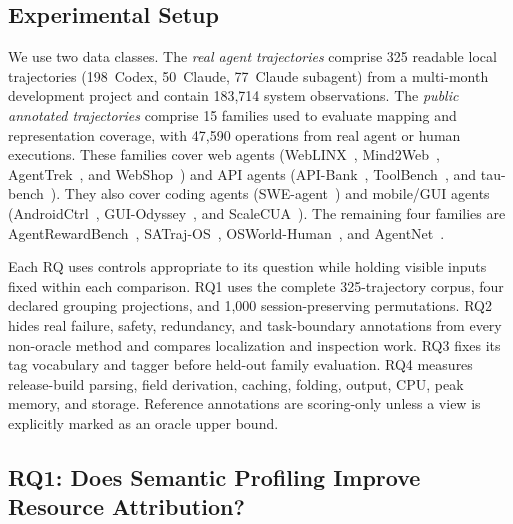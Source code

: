 \documentclass[letterpaper]{article}
\begin{document}
\subsection{Experimental Setup}

We use two data classes.
The \emph{real agent trajectories} comprise 325 readable local
trajectories (198~Codex, 50~Claude, 77~Claude subagent) from a
multi-month development project and contain 183{,}714 system
observations.
The \emph{public annotated trajectories} comprise 15 families used to
evaluate mapping and representation coverage, with 47{,}590 operations
from real agent or human executions.
These families cover web agents (WebLINX~\cite{weblinx},
Mind2Web~\cite{mind2web}, AgentTrek~\cite{agenttrek}, and
WebShop~\cite{webshop}) and API agents (API-Bank~\cite{apibank},
ToolBench~\cite{toolbench}, and tau-bench~\cite{taubench}). They also
cover coding agents (SWE-agent~\cite{sweagent}) and mobile/GUI agents
(AndroidCtrl~\cite{androidcontrol}, GUI-Odyssey~\cite{guiodyssey}, and
ScaleCUA~\cite{scalecua}). The remaining four families are
AgentRewardBench~\cite{agentrewardbench}, SATraj-OS~\cite{safactory},
OSWorld-Human~\cite{osworldhuman}, and AgentNet~\cite{opencua}.

Each RQ uses controls appropriate to its question while holding visible inputs
fixed within each comparison. RQ1 uses the complete 325-trajectory corpus,
four declared grouping projections, and 1{,}000 session-preserving
permutations. RQ2 hides real failure, safety, redundancy, and task-boundary
annotations from every non-oracle method and compares localization and
inspection work. RQ3 fixes its tag vocabulary and tagger before held-out
family evaluation. RQ4 measures release-build parsing, field derivation,
caching, folding, output, CPU, peak memory, and storage. Reference annotations
are scoring-only unless a view is explicitly marked as an oracle upper bound.
\subsection{RQ1: Does Semantic Profiling Improve Resource Attribution?}
\end{document}
